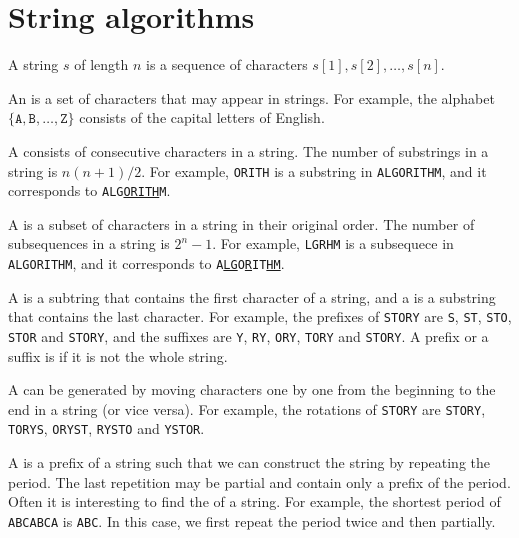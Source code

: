 \chapter{String algorithms}


A string $s$ of length $n$
is a sequence of characters
$s[1],s[2],\ldots,s[n]$.

An  is a set of characters
that may appear in strings.
For example, the alphabet
$\{\texttt{A},\texttt{B},\ldots,\texttt{Z}\}$
consists of the capital letters of English.


A  consists of consecutive
characters in a string.
The number of substrings in a string is $n(n+1)/2$.
For example, \texttt{ORITH} is a substring
in \texttt{ALGORITHM}, and it corresponds
to \texttt{ALG\underline{ORITH}M}.


A  is a subset of characters
in a string in their original order.
The number of subsequences in a string is $2^n-1$.
For example, \texttt{LGRHM} is a subsequece
in \texttt{ALGORITHM}, and it corresponds
to \texttt{A\underline{LG}O\underline{R}IT\underline{HM}}.


A  is a subtring that contains the first
character of a string,
and a  is a substring that contains the last character.
For example, the prefixes of
\texttt{STORY} are \texttt{S}, \texttt{ST},
\texttt{STO}, \texttt{STOR} and \texttt{STORY},
and the suffixes are \texttt{Y}, \texttt{RY},
\texttt{ORY}, \texttt{TORY} and \texttt{STORY}.
A prefix or a suffix is 
if it is not the whole string.


A  can be generated by moving
characters one by one from the beginning to the end
in a string (or vice versa).
For example, the rotations of \texttt{STORY} are
\texttt{STORY},
\texttt{TORYS},
\texttt{ORYST},
\texttt{RYSTO} and
\texttt{YSTOR}.


A  is a prefix of a string such that
we can construct the string by repeating the period.
The last repetition may be partial and contain
only a prefix of the period.
Often it is interesting to find the 
of a string.
For example, the shortest period of
\texttt{ABCABCA} is \texttt{ABC}.
In this case, we first repeat the period twice
and then partially.


